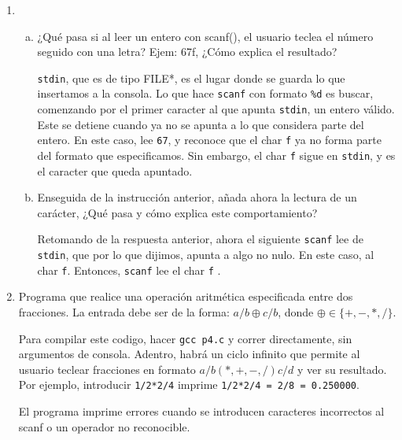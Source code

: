 \documentclass{article}
\begin{document}
\begin{enumerate}
		\item
		\begin{enumerate}[(a)]
			\item ¿Qué pasa si al leer un entero con scanf(), el usuario teclea el número seguido con una letra? Ejem: 67f, ¿Cómo explica el resultado?
			\begin{mdframed}[
				linecolor=darkgray,
				backgroundcolor=pearl]
				\texttt{stdin}, que es de tipo FILE*, es el lugar donde se guarda lo que insertamos a la consola. Lo que hace \texttt{scanf} con formato \texttt{\%d} es buscar, comenzando por el primer caracter al que apunta \texttt{stdin}, un entero v\'alido. Este se detiene cuando ya no se apunta a lo que considera parte del entero. En este caso, lee \texttt{67}, y reconoce que el char \texttt{f} ya no forma parte del formato que especificamos. Sin embargo, el char \texttt{f} sigue en \texttt{stdin}, y es el caracter que queda apuntado.
			\end{mdframed}
			\vspace{12pt}
			\item Enseguida de la instrucción anterior, añada ahora la lectura de un carácter, ¿Qué pasa y cómo explica este comportamiento?
			\begin{mdframed}[
				linecolor=darkgray,
				backgroundcolor=pearl]
				Retomando de la respuesta anterior, ahora el siguiente \texttt{scanf} lee de \texttt{stdin}, que por lo que dijimos, apunta a algo no nulo. En este caso, al char \texttt{f}. Entonces, \texttt{scanf} lee el char \texttt{f} \cite{cppreference:std_streams}.
			\end{mdframed}
		\end{enumerate}
		\vspace{12pt}
		\item
		Programa que realice una operaci\'on aritm\'etica especificada entre dos fracciones. La entrada debe ser de la forma: $a/b \oplus c/b$, donde $\oplus \in \{+, -, *, /\}$.
		\begin{mdframed}[
			linecolor=darkgray,
			backgroundcolor=pearl]
			Para compilar este codigo, hacer \texttt{gcc p4.c} y correr directamente, sin argumentos de consola. Adentro, habr\'a un ciclo infinito que permite al usuario teclear fracciones en formato $a/b(*,+,-,/)c/d$ y ver su resultado. Por ejemplo, introducir 
			\texttt{1/2*2/4} imprime
			\texttt{1/2*2/4 = 2/8 = 0.250000}. 
			
			El programa imprime errores cuando se introducen caracteres incorrectos al scanf o un operador no reconocible.
			
			

\end{mdframed}
\end{enumerate}
\end{document}
